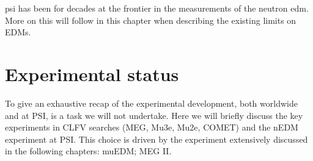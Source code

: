 \begin{refsection}
    \gls{psi} has been for decades at the frontier in the measurements of the neutron \gls{edm}.
    More on this will follow in this chapter when describing the existing limits on EDMs.\\
    \cite{edmasprobe}

\section{Experimental status}
    To give an exhaustive recap of the experimental development, both worldwide and at PSI, is a task we will not undertake. 
    Here we will briefly discuss the key experiments in CLFV searches (MEG, Mu3e, Mu2e, COMET) and the nEDM experiment at PSI.
    This choice is driven by the experiment extensively discussed in the following chapters: muEDM; MEG II.


\end{refsection}

